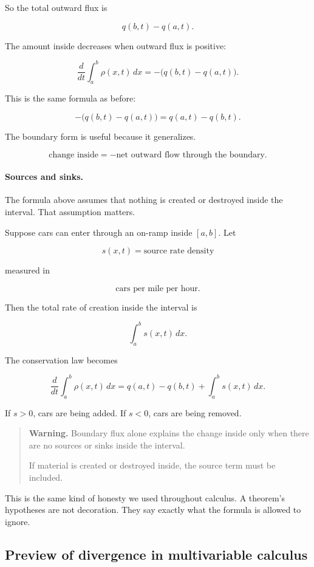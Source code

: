 So the total outward flux is

\[
q(b,t)-q(a,t).
\]

The amount inside decreases when outward flux is positive:

\[
\frac{d}{dt}\int_a^b \rho(x,t)\,dx
=
-\bigl(q(b,t)-q(a,t)\bigr).
\]

This is the same formula as before:

\[
-\bigl(q(b,t)-q(a,t)\bigr)=q(a,t)-q(b,t).
\]

The boundary form is useful because it generalizes.

\[
\boxed{
\text{change inside}=-\text{net outward flow through the boundary}.
}
\]

\paragraph{Sources and sinks.}
The formula above assumes that nothing is created or destroyed inside the interval.
That assumption matters.

Suppose cars can enter through an on-ramp inside \([a,b]\).  Let

\[
s(x,t)=\text{source rate density}
\]

measured in

\[
\text{cars per mile per hour}.
\]

Then the total rate of creation inside the interval is

\[
\int_a^b s(x,t)\,dx.
\]

The conservation law becomes

\[
\boxed{
\frac{d}{dt}\int_a^b \rho(x,t)\,dx
=
q(a,t)-q(b,t)+\int_a^b s(x,t)\,dx.
}
\]

If \(s>0\), cars are being added.  If \(s<0\), cars are being removed.

\begin{quote}
\textbf{Warning.}
Boundary flux alone explains the change inside only when there are no sources or
sinks inside the interval.

If material is created or destroyed inside, the source term must be included.
\end{quote}

This is the same kind of honesty we used throughout calculus.  A theorem's
hypotheses are not decoration.  They say exactly what the formula is allowed to
ignore.

\subsection{Preview of divergence in multivariable calculus}
\label{subsec:preview-divergence-multivariable}

